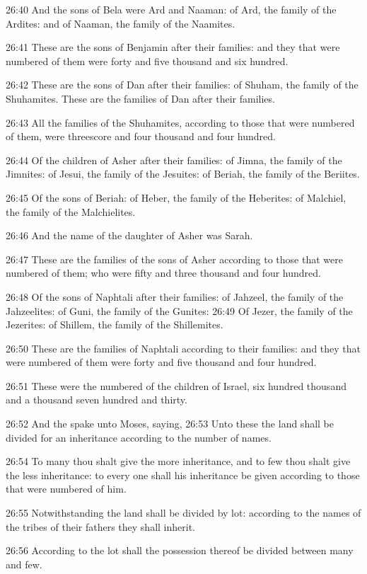 26:40 And the sons of Bela were Ard and Naaman: of Ard, the family of the Ardites: and of Naaman, the family of the Naamites.

26:41 These are the sons of Benjamin after their families: and they that were numbered of them were forty and five thousand and six hundred.

26:42 These are the sons of Dan after their families: of Shuham, the family of the Shuhamites. These are the families of Dan after their families.

26:43 All the families of the Shuhamites, according to those that were numbered of them, were threescore and four thousand and four hundred.

26:44 Of the children of Asher after their families: of Jimna, the family of the Jimnites: of Jesui, the family of the Jesuites: of Beriah, the family of the Beriites.

26:45 Of the sons of Beriah: of Heber, the family of the Heberites: of Malchiel, the family of the Malchielites.

26:46 And the name of the daughter of Asher was Sarah.

26:47 These are the families of the sons of Asher according to those that were numbered of them; who were fifty and three thousand and four hundred.

26:48 Of the sons of Naphtali after their families: of Jahzeel, the family of the Jahzeelites: of Guni, the family of the Gunites: 26:49 Of Jezer, the family of the Jezerites: of Shillem, the family of the Shillemites.

26:50 These are the families of Naphtali according to their families: and they that were numbered of them were forty and five thousand and four hundred.

26:51 These were the numbered of the children of Israel, six hundred thousand and a thousand seven hundred and thirty.

26:52 And the \LORD spake unto Moses, saying, 26:53 Unto these the land shall be divided for an inheritance according to the number of names.

26:54 To many thou shalt give the more inheritance, and to few thou shalt give the less inheritance: to every one shall his inheritance be given according to those that were numbered of him.

26:55 Notwithstanding the land shall be divided by lot: according to the names of the tribes of their fathers they shall inherit.

26:56 According to the lot shall the possession thereof be divided between many and few.

